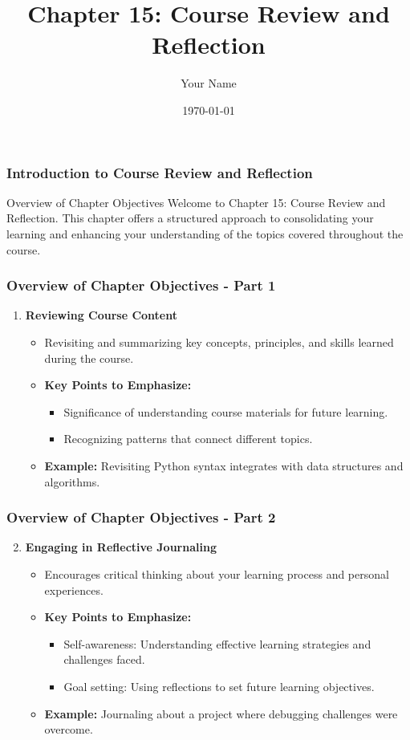 \documentclass{beamer}
\title{Chapter 15: Course Review and Reflection}
\author{Your Name}
\institute{Your Institution}
\date{\today}
\begin{document}
\frame{\titlepage}

\begin{frame}[fragile]
    \frametitle{Introduction to Course Review and Reflection}
    \begin{block}{Overview of Chapter Objectives}
        Welcome to Chapter 15: Course Review and Reflection. This chapter offers a structured approach to consolidating your learning and enhancing your understanding of the topics covered throughout the course.
    \end{block}
\end{frame}

\begin{frame}[fragile]
    \frametitle{Overview of Chapter Objectives - Part 1}
    \begin{enumerate}
        \item \textbf{Reviewing Course Content}
        \begin{itemize}
            \item Revisiting and summarizing key concepts, principles, and skills learned during the course.
            \item \textbf{Key Points to Emphasize:}
            \begin{itemize}
                \item Significance of understanding course materials for future learning.
                \item Recognizing patterns that connect different topics.
            \end{itemize}
            \item \textbf{Example:} Revisiting Python syntax integrates with data structures and algorithms.
        \end{itemize}
    \end{enumerate}
\end{frame}

\begin{frame}[fragile]
    \frametitle{Overview of Chapter Objectives - Part 2}
    \begin{enumerate}
        \setcounter{enumi}{1}
        \item \textbf{Engaging in Reflective Journaling}
        \begin{itemize}
            \item Encourages critical thinking about your learning process and personal experiences.
            \item \textbf{Key Points to Emphasize:}
            \begin{itemize}
                \item Self-awareness: Understanding effective learning strategies and challenges faced.
                \item Goal setting: Using reflections to set future learning objectives.
            \end{itemize}
            \item \textbf{Example:} Journaling about a project where debugging challenges were overcome.
        \end{itemize}
    \end{enumerate}
\end{frame}
\end{document}
